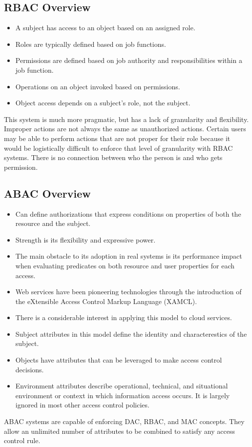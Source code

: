 \documentclass{math}
\begin{document}
\subsection*{RBAC Overview}
\begin{itemize}
  \item A subject has access to an object based on an assigned role.
  \item Roles are typically defined based on job functions.
  \item Permissions are defined based on job authority and responsibilities
  within a job function.
  \item Operations on an object invoked based on permissions.
  \item Object access depends on a subject's role, not the subject.
\end{itemize}
This system is much more pragmatic, but has a lack of granularity and
flexibility. Improper actions are not always the same as unauthorized actions.
Certain users may be able to perform actions that are not proper for their role
because it would be logistically difficult to enforce that level of granularity
with RBAC systems. There is no connection between who the person is and who gets
permission.

\subsection*{ABAC Overview}
\begin{itemize}
  \item Can define authorizations that express conditions on properties of both
  the resource and the subject.
  \item Strength is its flexibility and expressive power.
  \item The main obstacle to its adoption in real systems is its performance
  impact when evaluating predicates on both resource and user properties for
  each access.
  \item Web services have been pioneering technologies through the introduction
  of the eXtensible Access Control Markup Language (XAMCL).
  \item There is a considerable interest in applying this model to cloud
  services.
  \item Subject attributes in this model define the identity and
  characterestics of the subject.
  \item Objects have attributes that can be leveraged to make access control
  decisions.
  \item Environment attributes describe operational, technical, and situational
  environment or context in which information access occurs. It is largely
  ignored in most other access control policies.
\end{itemize}
ABAC systems are capable of enforcing DAC, RBAC, and MAC concepts. They allow
an unlimited number of attributes to be combined to satisfy any access control
rule.
\end{document}
